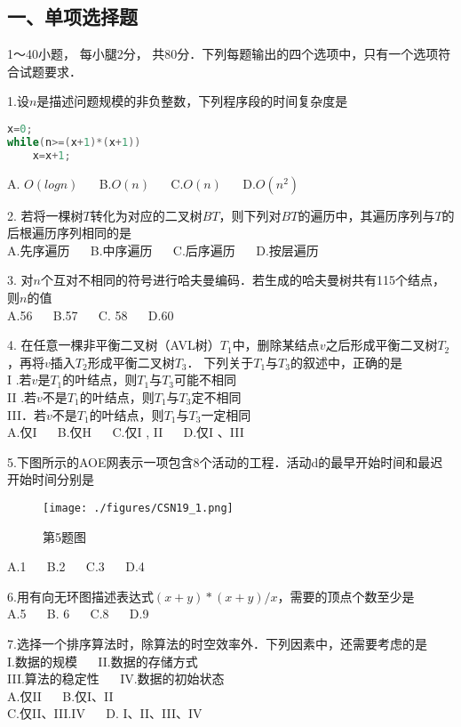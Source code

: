 
\subsection{一、单项选择题}
1～40小题， 每小腿2分， 共80分．下列每题输出的四个选项中，只有一个选项符合试题要求．

1.设$n$是描述问题规模的非负整数，下列程序段的时间复杂度是
\begin{lstlisting}[language=cpp]
x=0;
while(n>=(x+1)*(x+1))
    x=x+1;
\end{lstlisting}
A. $O(logn)$  $\quad$  B.$O(n)$  $\quad$   C.$O(n)$  $\quad$  D.$O(n^2)$

2. 若将一棵树$T$转化为对应的二叉树$BT$，则下列对$BT$的遍历中，其遍历序列与$T$的后根遍历序列相同的是 \\
A.先序遍历  $\quad$  B.中序遍历  $\quad$  C.后序遍历  $\quad$ D.按层遍历

3. 对$n$个互对不相同的符号进行哈夫曼编码．若生成的哈夫曼树共有115个结点，则$n$的值 \\
A.56  $\quad$  B.57  $\quad$  C. 58  $\quad$  D.60

4. 在任意一棵非平衡二叉树（AVL树）$T_1$中，删除某结点$v$之后形成平衡二叉树$T_2$，再将$v$插入$T_2$形成平衡二叉树$T_3$． 下列关于$T_1$与$T_3$的叙述中，正确的是 \\
I .若$v$是$T_1$的叶结点，则$T_1$与$T_3$可能不相同 \\
II .若$v$不是$T_1$的叶结点，则$T_1$与$T_3$定不相同  \\
III．若$v$不是$T_1$的叶结点，则$T_1$与$T_3$一定相同 \\
A.仅I  $\quad$  B.仅H  $\quad$ C.仅I , II  $\quad$  D.仅I 、III

5.下图所示的AOE网表示一项包含8个活动的工程．活动d的最早开始时间和最迟开始时间分别是
\begin{figure}[ht]
\centering
\texttt{[image: ./figures/CSN19\_1.png]}
\caption{第5题图} \label{CSN19_fig1}
\end{figure}
A.1  $\quad$  B.2  $\quad$  C.3  $\quad$  D.4

6.用有向无环图描述表达式$(x+y)*(x+y)/x$，需要的顶点个数至少是 \\
A.5  $\quad$  B. 6  $\quad$  C.8  $\quad$  D.9

7.选择一个排序算法时，除算法的时空效率外．下列因素中，还需要考虑的是 \\
I.数据的规模 $\quad$ II.数据的存储方式 \\
III.算法的稳定性 $\quad$ IV.数据的初始状态 \\
A.仅II $\quad$ B.仅I、II \\
C.仅II、III.IV $\quad$ D. I、II、III、IV

